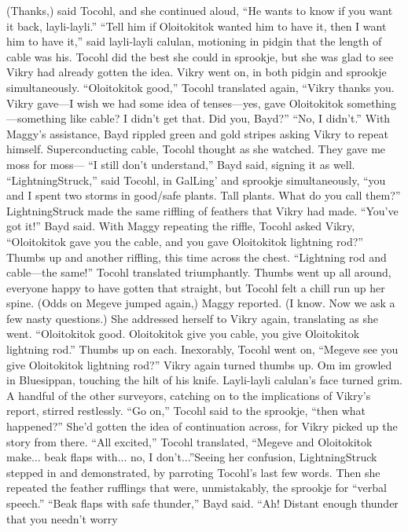 \documentclass[9pt]{article}
\begin{document}
(Thanks,) said Tocohl, and she continued aloud, “He wants to know if you want it back, layli-layli.”
“Tell him if Oloitokitok wanted him to have it, then I want him to have it,” said layli-layli calulan,
motioning in pidgin that the length of cable was his. Tocohl did the best she could in sprookje, but she
was glad to see Vikry had already gotten the idea.
Vikry went on, in both pidgin and sprookje simultaneously. “Oloitokitok good,” Tocohl translated
again, “Vikry thanks you. Vikry gave—I wish we had some idea of tenses—yes, gave Oloitokitok
something—something like cable? I didn’t get that. Did you, Bayd?”
“No, I didn’t.” With Maggy’s assistance, Bayd rippled green and gold stripes asking Vikry to repeat
himself.
Superconducting cable, Tocohl thought as she watched. They gave me moss for moss—
“I still don’t understand,” Bayd said, signing it as well.
“LightningStruck,” said Tocohl, in GalLing’ and sprookje simultaneously, “you and I spent two
storms in good/safe plants. Tall plants. What do you call them?”
LightningStruck made the same riffling of feathers that Vikry had made. “You’ve got it!” Bayd said.
With Maggy repeating the riffle, Tocohl asked Vikry, “Oloitokitok gave you the cable, and you gave
Oloitokitok lightning rod?”
Thumbs up and another riffling, this time across the chest. “Lightning rod and cable—the same!”
Tocohl translated triumphantly.
Thumbs went up all around, everyone happy to have gotten that straight, but Tocohl felt a chill run up
her spine. (Odds on Megeve jumped again,) Maggy reported.
(I know. Now we ask a few nasty questions.)
She addressed herself to Vikry again, translating as she went. “Oloitokitok good. Oloitokitok give
you cable, you give Oloitokitok lightning rod.” Thumbs up on each. Inexorably, Tocohl went on,
“Megeve see you give Oloitokitok lightning rod?”
Vikry again turned thumbs up. Om im growled in Bluesippan, touching the hilt of his knife. Layli-layli
calulan’s face turned grim. A handful of the other surveyors, catching on to the implications of Vikry’s
report, stirred restlessly.
“Go on,” Tocohl said to the sprookje, “then what happened?”
She’d gotten the idea of continuation across, for Vikry picked up the story from there. “All excited,”
Tocohl translated, “Megeve and Oloitokitok make... beak flaps with... no, I don’t...”Seeing her confusion, LightningStruck stepped in and demonstrated, by parroting Tocohl’s last few
words. Then she repeated the feather rufflings that were, unmistakably, the sprookje for “verbal speech.”
“Beak flaps with safe thunder,” Bayd said. “Ah! Distant enough thunder that you needn’t worry
\end{document}

